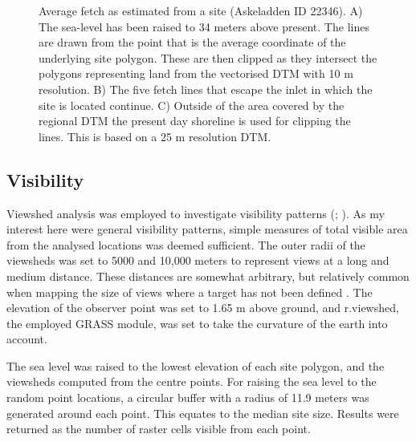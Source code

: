 \documentclass[12pt, a4paper]{article}
\begin{document}
\begin{figure}[!htb]
	\caption{Average fetch as estimated from a site (Askeladden ID 22346). A) The sea-level has been raised to 34 meters above present. The lines are drawn from the point that is the average coordinate of the underlying site polygon. These are then clipped as they intersect the polygons representing land from the vectorised DTM with 10 m resolution. B) The five fetch lines that escape the inlet in which the site is located continue. C) Outside of the area covered by the regional DTM the present day shoreline is used for clipping the lines. This is based on a 25 m resolution DTM.}\label{fig:fetch}
\end{figure}

\subsection{Visibility}
Viewshed analysis was employed to investigate visibility patterns (\citealp[][225--233]{conolly2006}; \citealp{gillings2020}). As my interest here were general visibility patterns, simple measures of total visible area from the analysed locations was deemed sufficient. The outer radii of the viewsheds was set to 5000 and 10,000 meters to represent views at a long and medium distance. These distances are somewhat arbitrary, but relatively common when mapping the size of views where a target has not been defined \citep[e.g.][]{lake2000, lopez2008, garcia2013}. The elevation of the observer point was set to 1.65 m above ground, and r.viewshed, the employed GRASS module, was set to take the curvature of the earth into account. \par
The sea level was raised to the lowest elevation of each site polygon, and the viewsheds computed from the centre points. For raising the sea level to the random point locations, a circular buffer with a radius of 11.9 meters was generated around each point. This equates to the median site size. Results were returned as the number of raster cells visible from each point. \par
\end{document}
